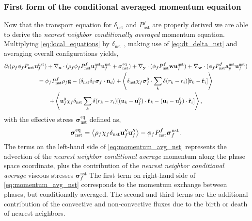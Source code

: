 \subsubsection{First form of the conditional averaged momentum equaiton}
Now that the transport equation for $\delta_\text{nst}$ and $P_\text{nst}^f$ are properly derived we are able to derive the \textit{nearest neighbor conditionally averaged} momentum equation. 
Multiplying \ref{eq:local_equations} by $\delta_\text{nst}$ , making use of \ref{eq:dt_delta_nst} and averaging overall configurations yields, 
\begin{multline}
    \pddt (\rho_f\phi_f P_\text{nst} \textbf{u}^\text{nst}_f)
    + \pddx\cdot (
        \rho_f\phi_fP_\text{nst}^f \textbf{u}^\text{nst}_f\textbf{u}^\text{nst}_f 
        +\bm\sigma_\text{nst}^\text{eq})
    + \pddy\cdot (\phi_fP_\text{nst}^f \textbf{w}\textbf{u}_f^\text{nst} )
    + \pddw\cdot (\phi_fP_\text{nst}^f \textbf{a}_p^\text{nst} \textbf{u}_f^\text{nst} )\\
    = 
    \phi_fP_\text{nst}^f  \rho_f \textbf{g}
    - \avg{\delta_\text{nst}\delta_\Gamma \bm\sigma_f \cdot \textbf{n}_d} 
    +\avg{
        \delta_\text{nst}
        \chi_f \bm\sigma_f^0 \cdot
        \sum_k 
        \delta(r_k - r_i)
        [\hat{\textbf{r}}_k - \hat{\textbf{r}}_i]}\\
    +\avg{
         \textbf{u}_f^0\chi_f \delta_\text{nst}
        \sum_k 
        \delta(r_k - r_i)
        [(\textbf{u}_k - \textbf{u}_f^0) \cdot \hat{\textbf{r}}_k - (\textbf{u}_i- \textbf{u}_f^0)  \cdot \hat{\textbf{r}}_i]},
    \label{eq:momentum_avg_nst}
\end{multline}
with the effective stress $\bm\sigma_\text{nst}^\text{eq}$ defined as, 
\begin{equation}
    \bm\sigma_\text{nst}^\text{eq}=
    \left<\rho_f\chi_f\delta_\text{nst} \textbf{u}''_f\textbf{u}''_f\right> 
    - \phi_f P_\text{nst}^f \bm\sigma^\text{nst}_f. 
\end{equation}
The terms on the left-hand side of \ref{eq:momentum_avg_nst} represents the advection of the \textit{nearest neighbor conditional average} momentum along the phase space coordinate, plus the contribution of the \textit{nearest neighbor conditional average} viscous stresses $\bm\sigma^\text{nst}_f$
The first term on right-hand side of \ref{eq:momentum_avg_nst} corresponds to the momentum exchange between phases, but conditionally averaged. 
The second and third terms are the additional contribution of the convective and non-convective fluxes due to the birth or death of nearest neighbors. 

